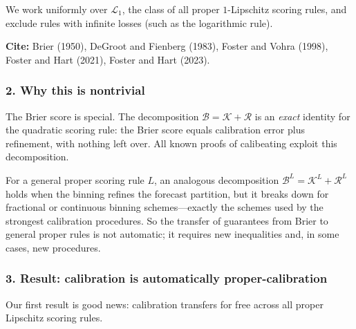 We work uniformly over $\mathcal{L}_{1}$, the class of all proper
$1$-Lipschitz scoring rules, and exclude rules with infinite losses
(such as the logarithmic rule).

\medskip\noindent\textbf{Cite:}
Brier (1950),
DeGroot and Fienberg (1983),
Foster and Vohra (1998),
Foster and Hart (2021),
Foster and Hart (2023).



\subsubsection*{2. Why this is nontrivial}

The Brier score is special.  The decomposition
$\mathcal{B} = \mathcal{K} + \mathcal{R}$ is an \emph{exact} identity
for the quadratic scoring rule: the Brier score equals calibration
error plus refinement, with nothing left over.  All known proofs of
calibeating exploit this decomposition.

For a general proper scoring rule $L$, an analogous decomposition
$\mathcal{B}^{L} = \mathcal{K}^{L} + \mathcal{R}^{L}$ holds when the
binning refines the forecast partition, but it breaks down for
fractional or continuous binning schemes---exactly the schemes used by
the strongest calibration procedures.  So the transfer of
guarantees from Brier to general proper rules is not automatic; it
requires new inequalities and, in some cases, new procedures.



\subsubsection*{3. Result: calibration is automatically proper-calibration}

Our first result is good news: calibration transfers for free across all
proper Lipschitz scoring rules.

